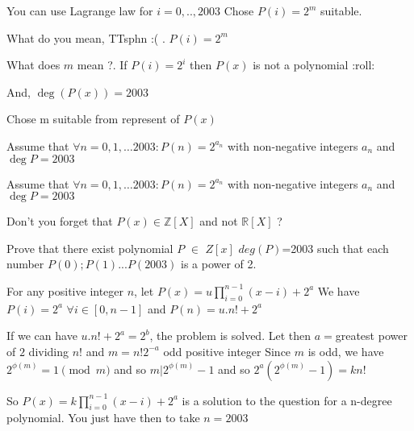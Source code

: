 \begin{solution}
	\begin{tcolorbox}You can use Lagrange law for $ i = 0,..,2003$
Chose $ P(i) = 2^{m}$ suitable.\end{tcolorbox}

What do you mean, TTsphn  :( . $ P(i) = 2^{m}$

What does $ m$ mean ?. If $ P(i) = 2^{i}$ then $ P(x)$ is not a polynomial  :roll:

And, $ \deg(P(x))=2003$  
\end{solution}



\begin{solution}
	Chose m suitable from represent  of $ P(x)$
\end{solution}



\begin{solution}
	Assume that $ \forall n=0,1,\ldots 2003: P(n)=2^{a_{n}}$ with non-negative integers $ a_{n}$ and $ \deg P=2003$
\end{solution}



\begin{solution}
	\begin{tcolorbox}Assume that $ \forall n = 0,1,\ldots 2003: P(n) = 2^{a_{n}}$ with non-negative integers $ a_{n}$ and $ \deg P = 2003$\end{tcolorbox}

Don't you forget that $ P(x)\in\mathbb{Z}[X]$ and not $ \mathbb{R}[X]$ ?
\end{solution}



\begin{solution}
	\begin{tcolorbox}Prove that there exist polynomial $ P$ $ \in$ $ Z[x]$ $ deg(P)$=2003 such that each number $ P(0);P(1)...P(2003)$ is a power  of 2.\end{tcolorbox}

For any positive integer $ n$, let $ P(x) = u\prod_{i = 0}^{n-1}(x-i)+2^{a}$
We have $ P(i) = 2^{a}$ $ \forall i\in[0,n-1]$ and $ P(n) = u.n!+2^{a}$

If we can have $ u.n!+2^{a}= 2^{b}$, the problem is solved.
Let then $ a =$greatest power of $ 2$ dividing $ n!$ and $ m = n!2^{-a}$ odd positive integer
Since $ m$ is odd, we have $ 2^{\phi(m)}= 1\pmod{m}$ and so $ m|2^{\phi(m)}-1$ and so $ 2^{a}(2^{\phi(m)}-1) = kn!$

So $ P(x) = k\prod_{i = 0}^{n-1}(x-i)+2^{a}$ is a solution to the question for a n-degree polynomial.
You just have then to take $ n = 2003$
\end{solution}



